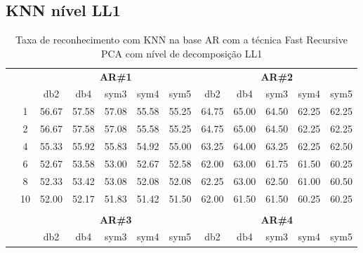 \subsection{KNN nível LL1}

\begin{table}[H]
	\centering
    \normalsize
	\caption{Taxa de reconhecimento com KNN na base AR com a técnica Fast Recursive PCA com nível de decomposição LL1}
	\begin{tabular}{|c|c|c c c c c|c c c c c|}
\cline{3-12}
\multicolumn{2}{c|}{\multirow{2}{*}{}} & \multicolumn{5}{c|}{\textbf{AR\#1}}  & \multicolumn{5}{c|}{\textbf{AR\#2}} \\\cline{3-12}

\multicolumn{2}{c|}{}  & db2 & db4 & sym3 & sym4 & sym5 & db2 & db4& sym3 & sym4 & sym5 \\\hline

\multicolumn{1}{|c|}{ \multirow{5}{*}{\rotatebox[origin=c]{90}{\textbf{K-vizinhos}}} }
&1	&56.67	&57.58	&57.08	&55.58	&55.25	&64.75	&65.00&	64.50&	62.25	&62.25	\\\cline{2-12}
&2	&56.67	&57.58	&57.08	&55.58	&55.25	&64.75	&65.00&	64.50&	62.25	&62.25	\\\cline{2-12}
&4	&55.33	&55.92	&55.83	&54.92	&55.00	&63.25	&64.00&	63.25&	62.25	&62.50	\\\cline{2-12}
&6	&52.67	&53.58	&53.00	&52.67	&52.58	&62.00	&63.00&	61.75&	61.50	&60.25	\\\cline{2-12}
&8	&52.33	&53.42	&53.08	&52.08	&52.08	&62.25	&63.00&	62.50&	61.00	&60.50	\\\cline{2-12}
&10	&52.00	&52.17	&51.83	&51.42	&51.50	&62.00	&61.50&	61.50&	60.25	&60.25	



\\ \midrule
\multicolumn{12}{c}{}\\ 

\cline{3-12}
\multicolumn{2}{c}{} & \multicolumn{5}{|c|}{\textbf{AR\#3}}  & \multicolumn{5}{c|}{\textbf{AR\#4}} \\\cline{3-12}
\multicolumn{2}{c}{}  & \multicolumn{1}{|c}{db2} & db4 & sym3 & sym4 & sym5 & db2 & db4& sym3 & sym4 & sym5 \\\hline


\end{tabular}
\end{table}
